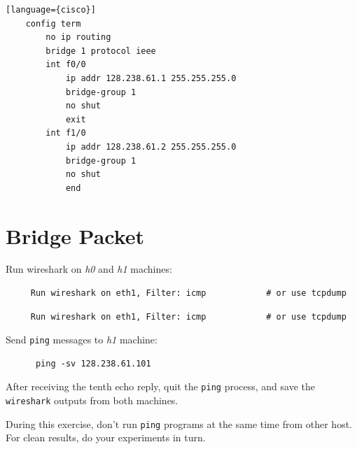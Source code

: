 \documentclass{UTNetLab}
\begin{document}
    \begin{lstlisting}[frame=trBL][language={cisco}]
    config term
    	no ip routing
   		bridge 1 protocol ieee 
    	int f0/0
   			ip addr 128.238.61.1 255.255.255.0
    		bridge-group 1
    		no shut
    		exit
    	int f1/0
    		ip addr 128.238.61.2 255.255.255.0
    		bridge-group 1
    		no shut
    		end
    \end{lstlisting}

\section{Bridge Packet}
    Run wireshark on \textit{h0} and \textit{h1} machines:
     
     \begin{lstlisting}
     Run wireshark on eth1, Filter: icmp            # or use tcpdump
     \end{lstlisting}  
             
     \begin{lstlisting}
     Run wireshark on eth1, Filter: icmp            # or use tcpdump
     \end{lstlisting}  
      
      Send \lstinline{ping} messages to \textit{h1} machine:
           
      \begin{lstlisting}
      ping -sv 128.238.61.101
      \end{lstlisting}
      
      After receiving the tenth echo reply, quit the \lstinline{ping} process, and save the \lstinline{wireshark}  outputs from both machines.
      
      During this exercise, don’t run \lstinline{ping} programs at the same time from other host. For clean results, do your experiments in turn.            
    
\end{document}

